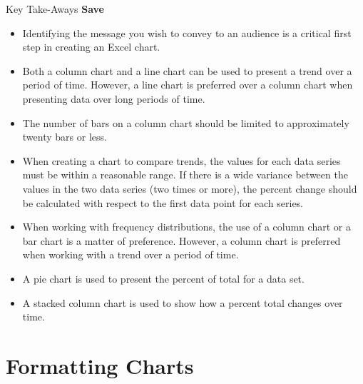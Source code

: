 \begin{center}
	\begin{tkwbox}{Key Take-Aways}
		\textbf{Save}
		\\
		\begin{itemize}
			\setlength{\itemsep}{0pt}
			\setlength{\parskip}{0pt}
			\setlength{\parsep}{0pt}
			
			\item Identifying the message you wish to convey to an audience is a critical first step in creating an Excel chart.
			\item Both a column chart and a line chart can be used to present a trend over a period of time. However, a line chart is preferred over a column chart when presenting data over long periods of time.
			\item The number of bars on a column chart should be limited to approximately twenty bars or less.
			\item When creating a chart to compare trends, the values for each data series must be within a reasonable range. If there is a wide variance between the values in the two data series (two times or more), the percent change should be calculated with respect to the first data point for each series.
			\item When working with frequency distributions, the use of a column chart or a bar chart is a matter of preference. However, a column chart is preferred when working with a trend over a period of time.
			\item A pie chart is used to present the percent of total for a data set.
			\item A stacked column chart is used to show how a percent total changes over time.

		\end{itemize}
	\end{tkwbox}
\end{center}


\section{Formatting Charts}


